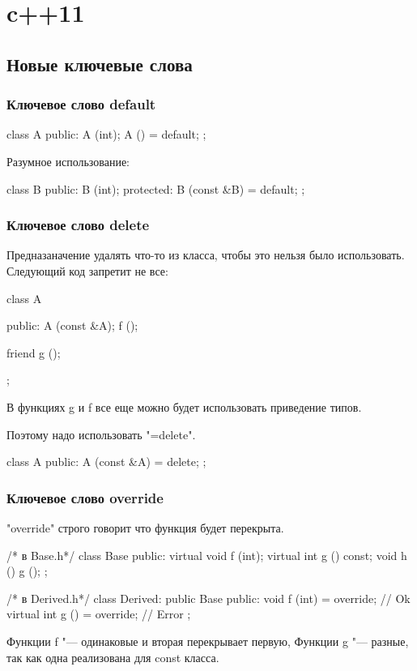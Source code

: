 \chapter{c++11}
\section{Новые ключевые слова}
\subsection{Ключевое слово default}

\begin{cppcode}
class A {
public:
	A (int); 
	A () = default;	
};
\end{cppcode}

Разумное использование: 
\begin{cppcode}
class B {
public:
	B (int); 
protected:
	B (const &B) = default;	
};
\end{cppcode}



\subsection{Ключевое слово delete}
Предназаначение удалять что-то из класса, чтобы это нельзя было использовать. 
Следующий код запретит не все:  
\begin{cppcode}
class A {
public:
	A (const &A);
	f ();

	friend g (); 
};
\end{cppcode}
В функциях g и f все еще можно будет использовать приведение типов. 

Поэтому надо использовать \cpp"=delete".
\begin{cppcode}
class A {
public:
	A (const &A) = delete;
};
\end{cppcode}


\subsection{Ключевое слово override}
\cpp"override" строго говорит что функция будет перекрыта.

\begin{cppcode}
/* в Base.h*/
class Base {
public:
	virtual void f (int);
	virtual int g () const; 
	void h () {
		g ();
	}
};

/* в Derived.h*/
class Derived: public Base {
public:
	void f (int) = override; // Ok
	virtual int g () = override; // Error
};
\end{cppcode}
Функции f "--- одинаковые и вторая перекрывает первую, Функции g "--- разные, так как одна реализована для const класса.



